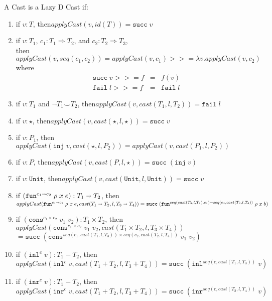 \documentclass[acmsmall,review,anonymous]{acmart}\settopmatter{printfolios=true,printccs=false,printacmref=false}
\newcommand{\plus}[0]{+}
\newcommand{\judgeType}[2]{#1 : #2}
\newcommand{\judgeTypeFT}[3]{#1 : #2 \Longrightarrow #3} %
\newcommand{\TOOdyn}[0]{\star}
\newcommand{\POOunit}[0]{\mathtt{Unit}}
\newcommand{\POOfun}[2]{#1 \shortrightarrow #2}
\newcommand{\POOprod}[2]{#1 \times #2}
\newcommand{\POOsum}[2]{#1 \plus #2}
\newcommand{\rOOsucc}[1]{\mathtt{succ}\;#1}
\newcommand{\rOOfail}[1]{\mathtt{fail}\;#1}
\newcommand{\hcvOOinj}[2]{\mathtt{inj} \; #2}
\newcommand{\hcvOOfun}[5]{\mathtt{fun}^{\POOfun{#1}{#5}} \; #2 \; #3 \; #4}
\newcommand{\hcvOOcons}[4]{\mathtt{cons}^{\POOprod{#2}{#4}}\;#1\;#3}
\newcommand{\hcvOOinl}[2]{\mathtt{inl}^{#2}\;#1}
\newcommand{\hcvOOinr}[2]{\mathtt{inr}^{#2}\;#1}
\begin{document}
\begin{definition}
	\label{def:surely-lazyd}
	A  Cast is a Lazy D Cast if:
	\begin{enumerate}
		\item if $v : T$, then$applyCast(v,id(T)) = \mathtt{succ} \; v $
		\item if $\judgeType{v}{T_1}$,
		$ \judgeTypeFT{c_1}{T_1}{T_2}$, and
		$ \judgeTypeFT{c_2}{T_2}{T_3}$,\\
		then$applyCast(v,seq(c_1,c_2)) = 
		applyCast(v,c_1) >>= \lambda v.applyCast(v,c_2)$\\
		where 
		\[
		\begin{array}{rcl}
		\rOOsucc{v} >>= f & = & f(v) \\
		\rOOfail{l} >>= f & = & \rOOfail{l}
		\end{array}
		\]
		\item if $v : T_1$ and $\neg T_1 \smile T_2$,
		then$applyCast(v,cast(T_1, l, T_2)) = \rOOfail{l} $
		\item if $v : \star$, 
		then$applyCast(v,cast(\TOOdyn,l,\TOOdyn)) = \rOOsucc{v} $
		\item if $v : P_1$,
		then$applyCast(\hcvOOinj{P_1}{v},cast(\star,l,P_2)) 
		= applyCast(v,cast(P_1,l,P_2)) $
		\item if $v : P$,
		then$applyCast(v,cast(P,l,\star)) = \rOOsucc{(\hcvOOinj{P}{v})} $
		\item if $v : \POOunit$,
		then$applyCast(v,cast(\POOunit,l,\POOunit)) = \rOOsucc{v} $
		\item if $(\hcvOOfun{c_1}{\rho}{x}{e}{c_2}) : \POOfun{T_1}{T_2}$,
		then\\
		$ 
		applyCast(\hcvOOfun{c_1}{\rho}{x}{e}{c_2}, 
		cast(\POOfun{T_1}{T_2},l,\POOfun{T_3}{T_4})) \\
		= 
		\rOOsucc{(\hcvOOfun{seq(cast(T_3,l,T_1),c_1)}{\rho}{x}{b}{seq(c_2,cast(T_2,l,T_4))})}$
		\item if $(\hcvOOcons{v_1}{c_1}{v_2}{c_2}) : \POOprod{T_1}{T_2}$,
		then \\
		$ 
		applyCast(\hcvOOcons{v_1}{c_1}{v_2}{c_2},cast(\POOprod{T_1}{T_2},l,T_3 
		\times 
		T_4))$\\
		$ = 
		\rOOsucc{(\hcvOOcons{v_1}{seq(c_1,cast(T_1,l,T_3))}{v_2}{seq(c_2,cast(T_2,l,T_4))})}
		$ 
		\item if $(\hcvOOinl{v}{c}) : \POOsum{T_1}{T_2}$,
		then \\
		$ 
		applyCast(\hcvOOinl{v}{c},cast(\POOsum{T_1}{T_2},l,\POOsum{T_3}{T_4}))
		= \rOOsucc{(\hcvOOinl{v}{seq(c,cast(T_1,l,T_3))})} $
		\item if $(\hcvOOinr{v}{c}) : \POOsum{T_1}{T_2}$,
		then \\$
		applyCast(\hcvOOinr{v}{c},cast(\POOsum{T_1}{T_2},l,\POOsum{T_3}{T_4}))
		= \rOOsucc{(\hcvOOinr{v}{seq(c,cast(T_2,l,T_4))})} $
	\end{enumerate}
\end{definition}
\end{document}
